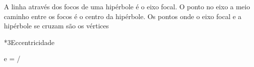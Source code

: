 \documentclass[\mainfilename]{subfiles}
\begin{document}
\begin{sectionBox}
    A linha através dos focos de uma hipérbole é o eixo focal. O ponto no eixo a meio caminho entre os focos é o centro da hipérbole. Os pontos onde o eixo focal e a hipérbole se cruzam são os vértices

    \begin{sectionBox}*3{Eccentricidade}
        
        \begin{BM}
            e = 
                \left\lvert
                \right\rvert
            \Bigg/
                \left\lvert
                \right\rvert
        \end{BM}
        
    \end{sectionBox}

\end{sectionBox}

\end{document}
